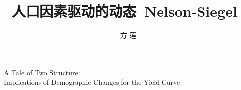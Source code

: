\UDC{ }
\author{方 莲}
\title{人口因素驱动的动态~Nelson-Siegel~\\ \tsm}
{A Tale of Two Structure:\\ \Large{Implications of Demographic Changes for the Yield Curve}}

\team{ }
\fundteam{ }
